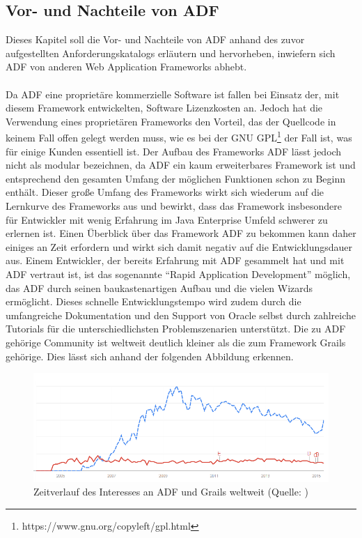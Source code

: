 \subsection{Vor- und Nachteile von ADF}
Dieses Kapitel soll die Vor- und Nachteile von ADF anhand des zuvor aufgestellten Anforderungskatalogs erläutern und hervorheben, inwiefern sich ADF von anderen Web Application Frameworks abhebt.\\\\
Da ADF eine proprietäre kommerzielle Software ist fallen bei Einsatz der, mit diesem Framework entwickelten, Software Lizenzkosten an. Jedoch hat die Verwendung eines proprietären Frameworks den Vorteil, das der Quellcode in keinem Fall offen gelegt werden muss, wie es bei der GNU GPL\footnote{https://www.gnu.org/copyleft/gpl.html} der Fall ist, was für einige Kunden essentiell ist. Der Aufbau des Frameworks ADF lässt jedoch nicht als modular bezeichnen, da ADF ein kaum erweiterbares Framework ist und entsprechend den gesamten Umfang der möglichen Funktionen schon zu Beginn enthält. Dieser große Umfang des Frameworks wirkt sich wiederum auf die Lernkurve des Frameworks aus und bewirkt, dass das Framework insbesondere für Entwickler mit wenig Erfahrung im Java Enterprise Umfeld schwerer zu erlernen ist. Einen Überblick über das Framework ADF zu bekommen kann daher einiges an Zeit erfordern und wirkt sich damit negativ auf die Entwicklungsdauer aus. Einem Entwickler, der bereits Erfahrung mit ADF gesammelt hat und mit ADF vertraut ist, ist das sogenannte "`Rapid Application Development"' möglich, das ADF durch seinen baukastenartigen Aufbau und die vielen Wizards ermöglicht. Dieses schnelle Entwicklungstempo wird zudem durch die umfangreiche Dokumentation und den Support von Oracle selbst durch zahlreiche Tutorials für die unterschiedlichsten Problemszenarien unterstützt. Die zu ADF gehörige Community ist weltweit deutlich kleiner als die zum Framework Grails gehörige. Dies lässt sich anhand der folgenden Abbildung erkennen. 
\begin{figure}[h]
\centering
\includegraphics[width=\textwidth]{img/interesse_zeitl.png}
\caption{Zeitverlauf des Interesses an ADF und Grails weltweit (Quelle: \GoogleTrends) }
\end{figure}
